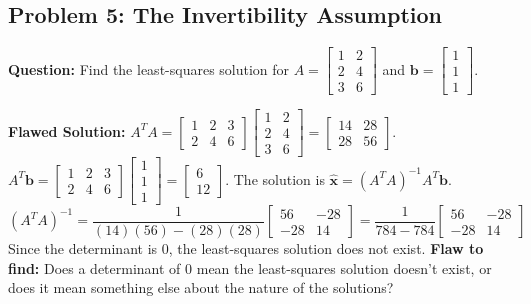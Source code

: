 \documentclass[11pt, letterpaper]{article}
\theoremstyle{definition}
\theoremstyle{remark}
\begin{document}
\subsection{Problem 5: The Invertibility Assumption}
\textbf{Question:} Find the least-squares solution for $A = \begin{bmatrix} 1 & 2 \\ 2 & 4 \\ 3 & 6 \end{bmatrix}$ and $\mathbf{b} = \begin{bmatrix} 1 \\ 1 \\ 1 \end{bmatrix}$.

\textbf{Flawed Solution:}
$A^T A = \begin{bmatrix} 1 & 2 & 3 \\ 2 & 4 & 6 \end{bmatrix} \begin{bmatrix} 1 & 2 \\ 2 & 4 \\ 3 & 6 \end{bmatrix} = \begin{bmatrix} 14 & 28 \\ 28 & 56 \end{bmatrix}$.
$A^T \mathbf{b} = \begin{bmatrix} 1 & 2 & 3 \\ 2 & 4 & 6 \end{bmatrix} \begin{bmatrix} 1 \\ 1 \\ 1 \end{bmatrix} = \begin{bmatrix} 6 \\ 12 \end{bmatrix}$.
The solution is $\hat{\mathbf{x}} = (A^T A)^{-1} A^T \mathbf{b}$.
\[ (A^T A)^{-1} = \frac{1}{(14)(56) - (28)(28)} \begin{bmatrix} 56 & -28 \\ -28 & 14 \end{bmatrix} = \frac{1}{784 - 784} \begin{bmatrix} 56 & -28 \\ -28 & 14 \end{bmatrix} \]
Since the determinant is 0, the least-squares solution does not exist.
\textbf{Flaw to find:} Does a determinant of 0 mean the least-squares solution doesn't exist, or does it mean something else about the nature of the solutions?
\end{document}
